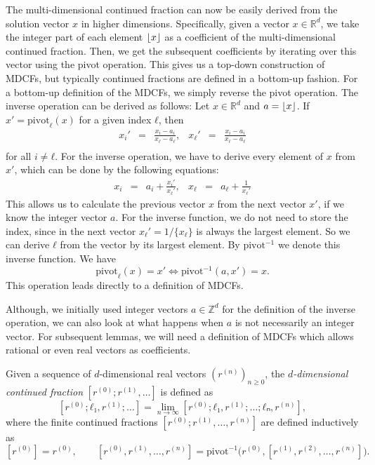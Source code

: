 The multi-dimensional continued fraction can now be easily derived from the
solution vector $x$ in higher dimensions.
Specifically, given a vector $x ∈ ℝ^d$, we take the integer part of each
element $\left\lfloor x\right\rfloor$ as a coefficient of the multi-dimensional continued
fraction.
Then, we get the subsequent coefficients by iterating over this vector using
the pivot operation.
This gives us a top-down construction of MDCFs, but typically continued
fractions are defined in a bottom-up fashion.
For a bottom-up definition of the MDCFs, we simply reverse the pivot operation.
The inverse operation can be derived as follows:
Let $x ∈ ℝ^d$ and $a = \left\lfloor x\right\rfloor$.
If $x' = \mathrm{pivot}_ℓ(x)$ for a given index $ℓ$, then
\[
  \begin{array}{lcrlcr}
    \displaystyle x_i' & = & \displaystyle \frac{x_i - a_i}{x_ℓ - a_ℓ}, &
    \displaystyle x_ℓ' & = & \displaystyle \frac{x_i - a_i}{x_ℓ - a_ℓ} \\[1em]
  \end{array}
\]
for all $i ≠ ℓ$.
For the inverse operation, we have to derive every element of $x$ from $x'$,
which can be done by the following equations:
\[
  \begin{array}{lcrlcr}
    \displaystyle x_i & = & a_i + \displaystyle \frac{x_i'}{x_ℓ'}, &
    \displaystyle x_ℓ & = & a_ℓ + \displaystyle \frac{1}{x_ℓ'}
  \end{array}
\]
This allows us to calculate the previous vector $x$ from the next vector $x'$,
if we know the integer vector $a$.
For the inverse function, we do not need to store the index,
since in the next vector $x_ℓ' = 1/\{x_ℓ\}$ is always the largest element.
So we can derive $ℓ$ from the vector by its largest element.
By $\mathrm{pivot}^{-1}$ we denote this inverse function.
We have
\[
  \mathrm{pivot}_ℓ(x) = x' \iff \mathrm{pivot}^{-1}(a, x') = x.
\]
This operation leads directly to a definition of MDCFs.

Although, we initially used integer vectors $a ∈ ℤ^d$ for the definition of the inverse operation,
we can also look at what happens when $a$ is not necessarily an integer vector.
For subsequent lemmas, we will need a definition of MDCFs which allows rational
or even real vectors as coefficients.

\begin{definition}
  Given a sequence of $d$-dimensional real vectors $(r^{(n)})_{n ≥ 0}$,
  the \emph{$d$-dimensional continued fraction} $[r^{(0)}; r^{(1)}, …]$ is defined as
  \[
    [r^{(0)}; ℓ₁, r^{(1)}; …] = \lim_{n → ∞} [r^{(0)}; ℓ₁, r^{(1)}; …; ℓₙ, r^{(n)}],
  \]
  where the finite continued fractions $[r^{(0)}; r^{(1)}, …, r^{(n)}]$
  are defined inductively as
  \[
    [r^{(0)}] = r^{(0)},
    \qquad
    [r^{(0)}, r^{(1)}, …, r^{(n)}]
    = \mathrm{pivot}^{-1}\big(r^{(0)}, [r^{(1)}, r^{(2)}, …, r^{(n)}]\big).
  \]
\end{definition}

